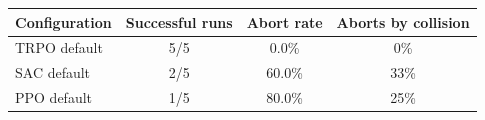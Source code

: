 \begin{tabular}{lccc}
\toprule
Configuration & Successful runs & Abort rate & Aborts by collision \\
\midrule
TRPO default & 5/5 & 0.0\% & 0\% \\
SAC default & 2/5 & 60.0\% & 33\% \\
PPO default & 1/5 & 80.0\% & 25\% \\
\bottomrule
\end{tabular}
